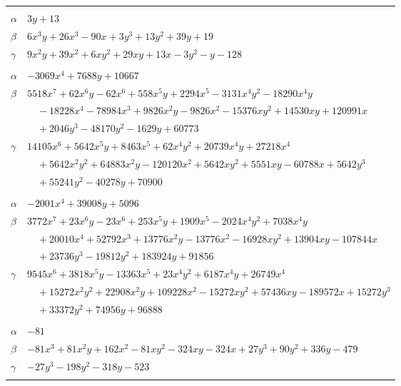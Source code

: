 \documentclass[11pt]{article}
\begin{document}
\begin{longtable}{@{}ll@{}}
\addlinespace[3pt]
\multicolumn{2}{@{}l}{$\{i,j\}=\{9,15\}$, $k_{ij}=2^{5}\cdot 5$}\\
$\alpha$ & $3y+13$\\
$\beta$ & $6x^{3}y+26x^{3}-90x+3y^{3}+13y^{2}+39y+19$\\
$\gamma$ & $9x^{2}y+39x^{2}+6xy^{2}+29xy+13x-3y^{2}-y-128$\\
\addlinespace[3pt]
\multicolumn{2}{@{}l}{$\{i,j\}=\{9,21\}$, $k_{ij}=2^{2}\cdot 3^{3}\cdot 5$}\\
$\alpha$ & $-3069x^{4}+7688y+10667$\\
$\beta$ & $5518x^{7}+62x^{6}y-62x^{6}+558x^{5}y+2294x^{5}-3131x^{4}y^{2}-18290x^{4}y$\\
 & $\quad -18228x^{4}-78984x^{3}+9826x^{2}y-9826x^{2}-15376xy^{2}+14530xy+120991x$\\
 & $\quad +2046y^{3}-48170y^{2}-1629y+60773$\\
$\gamma$ & $14105x^{6}+5642x^{5}y+8463x^{5}+62x^{4}y^{2}+20739x^{4}y+27218x^{4}$\\
 & $\quad +5642x^{2}y^{2}+64883x^{2}y-120120x^{2}+5642xy^{2}+5551xy-60788x+5642y^{3}$\\
 & $\quad +55241y^{2}-40278y+70900$\\
\addlinespace[3pt]
\multicolumn{2}{@{}l}{$\{i,j\}=\{9,23\}$, $k_{ij}=2^{6}$}\\
$\alpha$ & $-2001x^{4}+39008y+5096$\\
$\beta$ & $3772x^{7}+23x^{6}y-23x^{6}+253x^{5}y+1909x^{5}-2024x^{4}y^{2}+7038x^{4}y$\\
 & $\quad +20010x^{4}+52792x^{3}+13776x^{2}y-13776x^{2}-16928xy^{2}+13904xy-107844x$\\
 & $\quad +23736y^{3}-19812y^{2}+183924y+91856$\\
$\gamma$ & $9545x^{6}+3818x^{5}y-13363x^{5}+23x^{4}y^{2}+6187x^{4}y+26749x^{4}$\\
 & $\quad +15272x^{2}y^{2}+22908x^{2}y+109228x^{2}-15272xy^{2}+57436xy-189572x+15272y^{3}$\\
 & $\quad +33372y^{2}+74956y+96888$\\
\addlinespace[3pt]
\multicolumn{2}{@{}l}{$\{i,j\}=\{10,11\}$, $k_{ij}=2^{3}\cdot 5^{2}\cdot 7$}\\
$\alpha$ & $-81$\\
$\beta$ & $-81x^{3}+81x^{2}y+162x^{2}-81xy^{2}-324xy-324x+27y^{3}+90y^{2}+336y-479$\\
$\gamma$ & $-27y^{3}-198y^{2}-318y-523$\\
\addlinespace[3pt]
\multicolumn{2}{@{}l}{$\{i,j\}=\{10,13\}$, $k_{ij}=2\cdot 5^{2}$}\\

\end{longtable}
\end{document}

